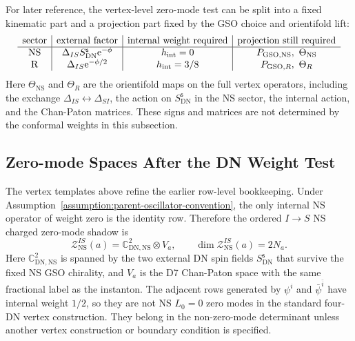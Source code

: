 \documentclass[11pt]{article}
\newcommand{\C}{\mathbb{C}}
\newcommand{\NS}{\mathrm{NS}}
\newcommand{\DN}{\mathrm{DN}}
\newcommand{\e}{\mathrm{e}}
\begin{document}
For later reference, the vertex-level zero-mode test can be split into a fixed kinematic part
and a projection part fixed by the GSO choice and orientifold lift:
\begin{equation}
  \begin{array}{c|c|c|c}
  \text{sector} & \text{external factor} & \text{internal weight required} &
  \text{projection still required} \\
  \hline
  \NS
  & \Delta_{IS}S_{\DN}^{\mathsf s}\e^{-\phi}
  & h_{\rm int}=0
  & P_{{\rm GSO},\NS},\ \Theta_{\NS} \\
  \mathrm R
  & \Delta_{IS}\e^{-\phi/2}
  & h_{\rm int}=3/8
  & P_{{\rm GSO},R},\ \Theta_R
  \end{array}
  \label{eq:external-DN-zero-mode-vertex-summary}
\end{equation}
Here \(\Theta_{\NS}\) and \(\Theta_R\) are the orientifold maps on the full vertex operators,
including the exchange \(\Delta_{IS}\leftrightarrow\Delta_{SI}\), the action on
\(S_{\DN}^{\mathsf s}\) in the NS sector, the internal action, and the Chan-Paton matrices.
These signs and matrices are not determined by the conformal weights in this subsection.

\subsection{Zero-mode Spaces After the DN Weight Test}

The vertex templates above refine the earlier row-level bookkeeping. Under
Assumption~\ref{assumption:parent-oscillator-convention}, the only internal NS operator of
weight zero is the identity row. Therefore the ordered \(I\to S\) NS charged zero-mode shadow is
\begin{equation}
  \mathcal Z_{\NS}^{IS}(a)
  =
  \C^2_{\DN,\NS}\otimes V_a,
  \qquad
  \dim \mathcal Z_{\NS}^{IS}(a)=2N_a.
  \label{eq:NS-zero-mode-space-after-DN-test}
\end{equation}
Here \(\C^2_{\DN,\NS}\) is spanned by the two external DN spin fields
\(S_{\DN}^{\mathsf s}\) that survive the fixed NS GSO chirality, and \(V_a\) is the D7
Chan-Paton space with the same fractional label as the instanton. The adjacent rows generated
by \(\psi^i\) and \(\bar\psi^{\bar i}\) have internal weight \(1/2\), so they are not NS
\(L_0=0\) zero modes in the standard four-DN vertex construction. They belong in
the non-zero-mode determinant unless another vertex construction or boundary condition is
specified.
\end{document}
